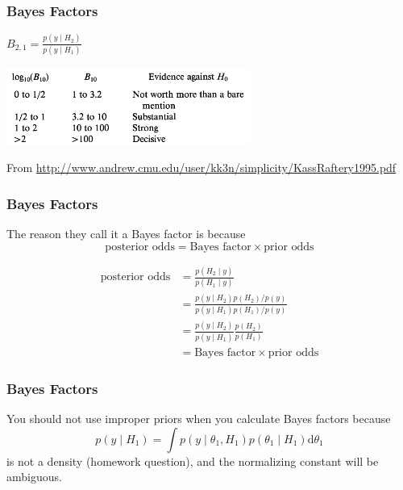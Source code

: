 \documentclass{beamer}
\begin{document}
\begin{frame}
\frametitle{Bayes Factors}

$B_{2,1} = \frac{p(y \mid H_2)}{p(y \mid H_1)}$

\begin{center}
\includegraphics[width=80mm]{bf_scale.png}
\end{center}

From \href{http://www.andrew.cmu.edu/user/kk3n/simplicity/KassRaftery1995.pdf}{http://www.andrew.cmu.edu/user/kk3n/simplicity/KassRaftery1995.pdf}

\end{frame}


\begin{frame}
\frametitle{Bayes Factors}

The reason they call it a Bayes factor is because
\[
\text{posterior odds} = \text{Bayes factor} \times \text{prior odds}
\]
\pause

\begin{align*}
\text{posterior odds} &= \frac{p(H_2 \mid y)}{p(H_1 \mid y)} \\
&= \frac{p(y \mid H_2)p(H_2) / p(y)}{p(y \mid H_1)p(H_1) / p(y)} \tag{Bayes rule} \\
&= \frac{p(y \mid H_2)}{p(y \mid H_1)} \frac{p(H_2)}{p(H_1)} \\
&= \text{Bayes factor} \times \text{prior odds}
\end{align*}



\end{frame}


\begin{frame}
\frametitle{Bayes Factors}

You should not use improper priors when you calculate Bayes factors because
\[
p(y \mid H_1) = \int p(y \mid \theta_1, H_1)p(\theta_1 \mid H_1) \text{d}\theta_1
\]
is not a density (homework question), and the normalizing constant will be ambiguous.

\end{frame}
\end{document}

